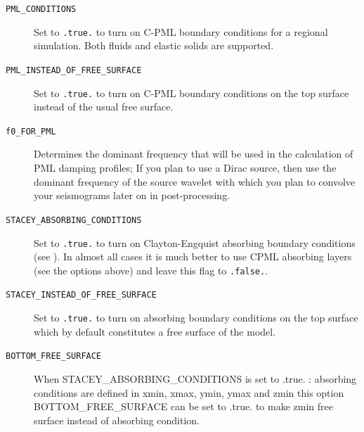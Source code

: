 \vspace{1cm}
\begin{description}
\item [{\texttt{PML\_CONDITIONS}}] Set to \texttt{.true.} to turn on C-PML
boundary conditions for a regional simulation. Both fluids and elastic solids are supported.
%
\item [{\texttt{PML\_INSTEAD\_OF\_FREE\_SURFACE}}] Set to \texttt{.true.}
to turn on C-PML boundary conditions on the top surface instead of
the usual free surface.
%
\item [{\texttt{f0\_FOR\_PML}}] Determines the dominant frequency that
will be used in the calculation of PML damping profiles;
If you plan to use a Dirac source, then use the dominant frequency of the source wavelet
with which you plan to convolve your seismograms later on in post-processing.
%
\item [{\texttt{STACEY\_ABSORBING\_CONDITIONS}}] Set to \texttt{.true.}
to turn on Clayton-Engquist absorbing boundary conditions (see \citet{KoTr99}).
In almost all cases it is much better to use CPML absorbing layers
(see the options above) and leave this flag to \texttt{.false.}.
%
\item [{\texttt{STACEY\_INSTEAD\_OF\_FREE\_SURFACE}}] Set to \texttt{.true.}
to turn on absorbing boundary conditions on the top surface which
by default constitutes a free surface of the model.
%
\item [{\texttt{BOTTOM\_FREE\_SURFACE}}]
When STACEY\_ABSORBING\_CONDITIONS is set to .true. :
absorbing conditions are defined in xmin, xmax, ymin, ymax and zmin
this option BOTTOM\_FREE\_SURFACE can be set to .true. to
make zmin free surface instead of absorbing condition.
\end{description}

